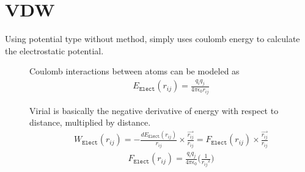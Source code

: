 \documentclass[letterpaper,10pt,english]{sphinxmanual}
\begin{document}
\section{VDW}
\label{\detokenize{electrostatic:vdw}}
Using  potential type without  method, simply uses coulomb energy to calculate the electrostatic potential.
\begin{description}
\item[{}] \leavevmode
Coulomb interactions between atoms can be modeled as
\begin{equation*}
\begin{split}E_{\texttt{Elect}}(r_{ij}) = \frac{q_i q_j}{4\pi \epsilon_0 r_{ij}}\end{split}
\end{equation*}
\item[{}] \leavevmode
Virial is basically the negative derivative of energy with respect to distance, multiplied by distance.
\begin{equation*}
\begin{split}W_{\texttt{Elect}}(r_{ij}) = -\frac{dE_{\texttt{Elect}}(r_{ij})}{r_{ij}}\times \frac{\overrightarrow{r_{ij}}}{{r_{ij}}} = F_{\texttt{Elect}}(r_{ij}) \times \frac{\overrightarrow{r_{ij}}}{{r_{ij}}}\end{split}
\end{equation*}\begin{equation*}
\begin{split}F_{\texttt{Elect}}(r_{ij}) = \frac{q_i q_j}{4\pi \epsilon_0} \Big( \frac{1}{{r_{ij}}^2} \Big)\end{split}
\end{equation*}
\end{description}
\end{document}
